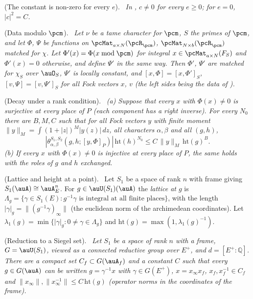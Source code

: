 \documentclass[10pt]{amsart}
\theoremstyle{definition}
\theoremstyle{remark}
\newcommand{\Q}{\mathbb Q}
\newenvironment{quotedthm}[2]{\par\medskip\noindent\begingroup
  \textbf{#1}#2.\ \itshape\ignorespaces}{\endgroup\par\medskip}
\newenvironment{quoteddef}[2]{\par\medskip\noindent\begingroup
  \textbf{#1}#2.\ \ignorespaces}{\endgroup\par\medskip}
\begin{document}
\begin{quotedthm}{\cite[Corollary~3.4]{P53}}{ (The constant is non-zero for every $e$)}
In {\cite[Theorem~3.2]{P53}}, $c\ne0$ for every $e\ge0$; for $e=0$, $|c|^2=C$.
\end{quotedthm}

\begin{quotedthm}{\cite[Lemma~3.24]{P53}}{ (Data modulo $\pcm$)}
Let $\nu$ be a tame character for $\pcm$, $S$ the primes of $\pcm$, and let $\Phi$, $\Psi$ be
functions on $\pcMat_{a\times N}(\pcR_\pcm)$, $\pcMat_{N\times b}(\pcR_\pcm)$ matched for $\chi$. Let
$\Phi'(x)=\Phi(x\bmod\pcm)$ for integral $x\in\pcMat_{a\times N}(F_S)$ and $\Phi'(x)=0$ otherwise,
and define $\Psi'$ in the same way. Then $\Phi'$, $\Psi'$ are matched for $\chi_S$ over $\auO_S$,
$\Psi'$ is locally constant, and $[x,\Phi]=[x,\Phi']_S$, $[v,\Psi]=[v,\Psi']_S$ for all Fock
vectors $x$, $v$ (the left sides being the data of {\cite[\S2.3]{P53}}).
\end{quotedthm}

\begin{quotedthm}{\cite[Proposition~3.26]{P53}}{ (Decay under a rank condition)}
\textup{(a)} Suppose that every $x$ with $\Phi(x)\ne0$ is surjective at every place of $P$ (each
component has a right inverse). For every $N_0$ there are $B,M,C$ such that for all
Fock vectors $y$ with finite moment $\|y\|_M=\int(1+|z|)^M|y(z)|\,dz$, all characters
$\alpha,\beta$ and all $(g,h)$,
\[
|\theta^{S_1,S_2}_{\alpha,\beta}(g,h;[y,\Phi]_P)|\,\mathrm{ht}(h)^{N_0}\le C\,\|y\|_M\,
\mathrm{ht}(g)^B .
\]
\textup{(b)} If every $x$ with $\Phi(x)\ne0$ is injective at every place of $P$, the same holds with
the roles of $g$ and $h$ exchanged.
\end{quotedthm}

\begin{quoteddef}{\cite[Definition~3.27]{P53}}{ (Lattice and height at a point)}
Let $S_1$ be a space of rank $n$ with frame giving $S_1(\auA)\cong\auA_E^n$. For $g\in\auU(S_1)(\auA)$
the \emph{lattice at $g$} is $\Lambda_g=\{\gamma\in S_1(E): g^{-1}\gamma\text{ is integral at all
finite places}\}$, with the length $|\gamma|_g=\|(g^{-1}\gamma)_\infty\|$ (the euclidean norm of the
archimedean coordinates). Let $\lambda_1(g)=\min\{|\gamma|_g:0\ne\gamma\in\Lambda_g\}$ and
$\mathrm{ht}(g)=\max(1,\lambda_1(g)^{-1})$.
\end{quoteddef}

\begin{quotedthm}{\cite[Lemma~3.28]{P53}}{ (Reduction to a Siegel set)}
Let $S_1$ be a space of rank $n$ with a frame, $G=\auU(S_1)$, viewed as a connected reductive group over
$E^+$, and $d=[E^+:\Q]$. There are a compact set $C_f\subset G(\auA_f)$ and a constant $C$ such that every
$g\in G(\auA)$ can be written $g=\gamma^{-1}x$ with $\gamma\in G(E^+)$, $x=x_\infty x_f$, $x_f,x_f^{-1}\in C_f$
and $\|x_\infty\|,\|x_\infty^{-1}\|\le C\,\mathrm{ht}(g)$ (operator norms in the
coordinates of the frame).
\end{quotedthm}
\end{document}
